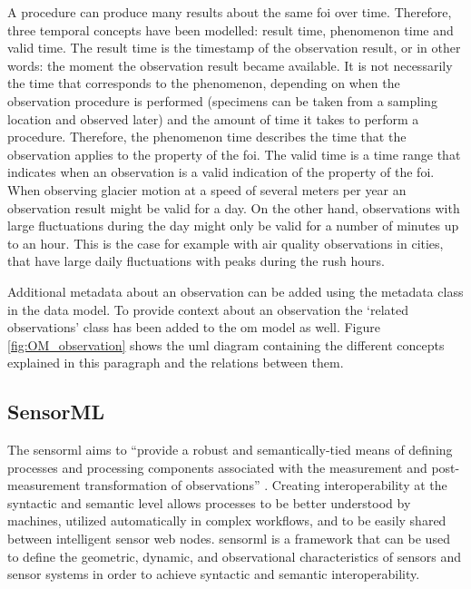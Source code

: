 A procedure can produce many results about the same \ac{foi} over time. Therefore, three temporal concepts have been modelled: result time, phenomenon time and valid time. The result time is the timestamp of the observation result, or in other words: the moment the observation result became available. It is not necessarily the time that corresponds to the phenomenon, depending on when the observation procedure is performed (specimens can be taken from a sampling location and observed later) and the amount of time it takes to perform a procedure. Therefore, the phenomenon time describes the time that the observation applies to the property of the \ac{foi}. The valid time is a time range that indicates when an observation is a valid indication of the property of the \ac{foi}. When observing glacier motion at a speed of several  meters per year an observation result might be valid for a day. On the other hand, observations with large fluctuations during the day might only be valid for a number of minutes up to an hour. This is the case for example with air quality observations in cities, that have large daily fluctuations with peaks during the rush hours.     

Additional metadata about an observation can be added using the metadata class in the data model. To provide context about an observation the `related observations' class has been added to the \ac{om} model as well. Figure \ref{fig:OM_observation} shows the \ac{uml} diagram containing the different concepts explained in this paragraph and the relations between them.  

\subsection{SensorML}
\label{par:sensorml}

The \acf{sensorml} aims to \enquote{provide a robust and semantically-tied means of defining processes and processing components associated with the measurement and post-measurement transformation of observations} \citep[p. ix]{SW:OGC7}. Creating interoperability at the syntactic and semantic level allows processes to be better understood by machines, utilized automatically in complex workflows, and to be easily shared between intelligent sensor web nodes. \ac{sensorml} is a framework that can be used to define the geometric, dynamic, and observational characteristics of sensors and sensor systems in order to achieve syntactic and semantic interoperability. 

